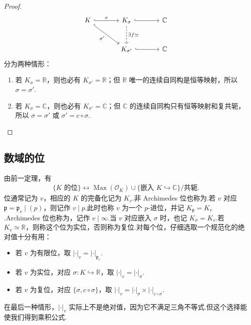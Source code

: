 \begin{proof}
\begin{align*}
\begin{tikzcd}[ampersand replacement=\&,column sep=large,row sep=large]
K \arrow[r,hook,"\sigma"] \arrow[dr,hook,"\sigma'"']
\& K_\sigma \arrow[r,hook] \arrow[d,dashed,"\exists f\simeq"]
\& \mathbb C \\
\& K_{\sigma'} \arrow[r,hook] \& \mathbb C
\end{tikzcd}
\end{align*}
分为两种情形：
\begin{enumerate}[label=(\alph*)]
\item 若 $K_\sigma=\mathbb R$，则也必有 $K_{\sigma'}=\mathbb R$；但 $\mathbb R$ 唯一的连续自同构是恒等映射，所以 $\sigma=\sigma'$.
\item 若 $K_\sigma=\mathbb C$，则也必有 $K_{\sigma'}=\mathbb C$；但 $\mathbb C$ 的连续自同构只有恒等映射和复共轭，所以 $\sigma=\sigma'$ 或 $\sigma'=c\circ\sigma$.
\end{enumerate}
\end{proof}
\subsection{数域的位}\label{sec:nt-4-1-6}
由前一定理，有
\begin{align*}
\{K\text{ 的位}\}\longleftrightarrow
\operatorname{Max}(\mathcal O_K)\cup\{\text{嵌入 }K\hookrightarrow\mathbb C\}/{\text{共轭}}.
\end{align*}
位通常记为 $v$，相应的 $K$ 的完备化记为 $K_v$.非 Archimedes 位也称为.若 $v$ 对应 $\mathfrak p=\mathfrak p_v\mid(p)$，则记作 $v\mid p$.此时也称 $v$ 为一个 $p$-进位，并记 $K_{\mathfrak p}=K_v$.Archimedes 位也称为，记作 $v\mid\infty$.当 $v$ 对应嵌入 $\sigma$ 时，也记 $K_\sigma=K_v$.若 $K_v\simeq\mathbb R$，则称这个位为实位，否则称为复位.对每个位，仔细选取一个规范化的绝对值十分有用：
\begin{itemize}
\item 若 $v$ 为有限位，取 $|\cdot|_v=|\cdot|_{\mathfrak p_v}$.
\item 若 $v$ 为实位，对应 $\sigma\colon K\hookrightarrow\mathbb R$，取 $|\cdot|_v=|\cdot|_\sigma$.
\item 若 $v$ 为复位，对应 $\{\sigma,c\circ\sigma\}$，取 $|\cdot|_v=|\cdot|_\sigma\times|\cdot|_{c\circ\sigma}$.
\end{itemize}
在最后一种情形，$|\cdot|_v$ 实际上不是绝对值，因为它不满足三角不等式.但这个选择能使我们得到乘积公式.
